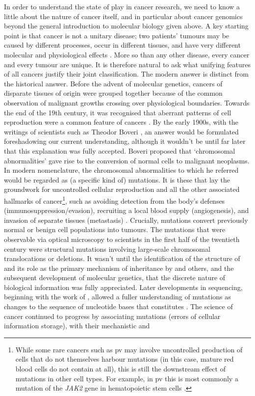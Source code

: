 \documentclass[thesis.tex]{subfiles}
\begin{document}
In order to understand the state of play in cancer research, we need to know a little about the nature of cancer itself, and in particular about cancer genomics beyond the general introduction to molecular biology given above. A key starting point is that cancer is not a unitary disease;  two patients’ tumours may be caused by different processes, occur in different tissues, and have very different molecular and physiological effects \citep{wittekind_tnm_2016}. More so than any other disease, every cancer and every tumour are unique. It is therefore natural to ask what unifying features of all cancers justify their joint classification. The modern answer is distinct from the historical answer. Before the advent of molecular genetics, cancers of disparate tissues of origin were grouped together because of the common observation of malignant growths crossing over physiological boundaries. Towards the end of the 19th century, it was recognised that aberrant patterns of cell reproduction were a common feature of cancers \citep{weinstein_history_2008}. By the early 1900s, with the writings of scientists such as Theodor Boveri \citep[see][for a modern translation]{boveri_concerning_2008}, an answer would be formulated foreshadowing our current understanding, although it wouldn't be until far later that this explanation was fully accepted. Boveri proposed that `chromosomal abnormalities' gave rise to the conversion of normal cells to malignant neoplasms. In modern nomenclature, the chromosomal abnormalities to which he referred would be regarded as (a specific kind of) mutations. It is these that lay the groundwork for uncontrolled cellular reproduction and all the other associated hallmarks of cancer\footnote{While some rare cancers such as \gls{pv} may involve uncontrolled production of cells that do not themselves harbour mutations (in this case, mature red blood cells do not contain  at all), this is still the downstream effect of mutations in other cell types. For example, in \gls{pv} this is most commonly a mutation of the \textit{JAK2} gene in hematopoietic stem cells \citep{tefferi_jak2_2007}.}, such as avoiding detection from the body's defenses (immunosuppression/evasion), recruiting a local blood supply (angiogenesis), and invasion of separate tissues (metastasis) \citep{hanahan_hallmarks_2011}. Crucially, mutations convert previously normal or benign cell populations into tumours. The mutations that were observable via optical microscopy to scientists in the first half of the twentieth century were structural mutations involving large-scale chromosomal translocations or deletions. It wasn't until the identification of the structure of  and its role as the primary mechanism of inheritance by \citet{watson_molecular_1953} and others, and the subsequent development of molecular genetics, that the discrete nature of biological information was fully appreciated. Later developments in  sequencing, beginning with the work of \citet{sanger_dna_1977}, allowed a fuller understanding of mutations as changes to the sequence of nucleotide bases that constitutes . The science of cancer continued to progress by associating  mutations (errors of cellular information storage), with their mechanistic and 
\end{document}
